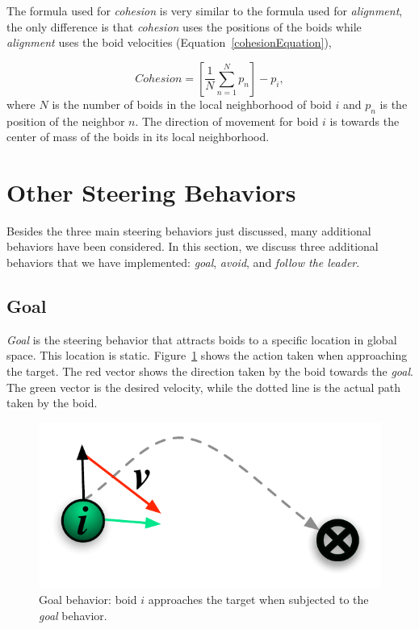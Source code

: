 The formula used for \textit{cohesion} is very similar to the formula used for \textit{alignment}, the only difference is that \textit{cohesion} uses the positions of the boids while \textit{alignment} uses the boid velocities (Equation~\ref{cohesionEquation}),

\begin{equation}
\label{cohesionEquation}
Cohesion = \left[  \frac{1}{N} \sum_{n=1}^{N} p_n \right ] - p_i, 
\end{equation}
where $N$ is the number of boids in the local neighborhood of boid $i$ and $p_n$ is the position of the neighbor $n$. The direction of movement for boid $i$ is towards the center of mass of the boids in its local neighborhood. 

\section{Other Steering Behaviors}\label{otherbehaviors}
Besides the three main steering behaviors just discussed, many additional behaviors have been considered. In this section, we discuss three additional behaviors that we have implemented: \textit{goal}, \textit{avoid}, and \textit{follow the leader}.

\subsection{Goal}
\textit{Goal} is the steering behavior that attracts boids to a specific location in global space. This location is static. Figure~\ref{goalPDF} shows the action taken when approaching the target. The red vector shows the direction taken by the boid towards the \textit{goal}. The green vector is the desired velocity, while the dotted line is the actual path taken by the boid.

\begin{figure}[htbp]
\begin{center}
\includegraphics[scale=0.95]{figures/goal.pdf}
\caption{Goal behavior: boid $i$ approaches the target when subjected to the \textit{goal} behavior.}
\label{goalPDF}
\end{center}
\end{figure}

